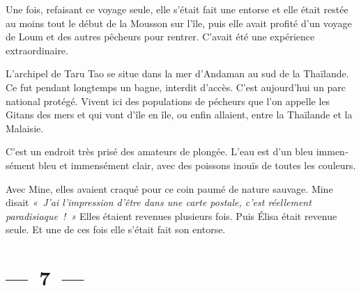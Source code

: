 \documentclass[french,twoside]{book} %
\begin{document}
\begin{center}
\par
\end{center}


\begin{center}
\par
\end{center}

\bigbreak
\noindent Une fois, refaisant ce voyage seule, elle s’était fait une entorse et elle était restée au moins tout le début de la Mousson sur l’île, puis elle avait profité d’un voyage de Loum et des autres pêcheurs pour rentrer. C’avait été une expérience extraordinaire.\par
L’archipel de Taru Tao se situe dans la mer d’Andaman au sud de la Thaïlande. Ce fut pendant longtemps un bagne, interdit d’accès. C’est aujourd’hui un parc national protégé. Vivent ici des populations de pécheurs que l’on appelle les Gitans des mers et qui vont d’île en île, ou enfin allaient, entre la Thaïlande et la Malaisie.\par
C’est un endroit très prisé des amateurs de plongée. L’eau est d’un bleu immen­sément bleu et immensément clair, avec des poissons inouïs de toutes les couleurs.\par
Avec Mine, elles avaient craqué pour ce coin paumé de nature sauvage. Mine disait \emph{« J’ai l’impression d’être dans une carte postale, c’est réellement paradisiaque ! »} Elles étaient revenues plusieurs fois. Puis Élisa était revenue seule. Et une de ces fois elle s’était fait son entorse.

\section[{— 7 —}]{— 7 —}
\renewcommand{\leftmark}{— 7 —}
\end{document}
